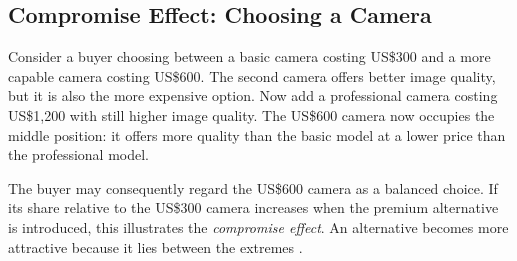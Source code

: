 \documentclass[12pt,oneside]{report}
\begin{document}
\subsection{Compromise Effect: Choosing a Camera}

Consider a buyer choosing between a basic camera costing US\$300
and a more capable camera costing US\$600. The second camera offers
better image quality, but it is also the more expensive option.
Now add a professional camera costing US\$1,200 with still higher
image quality. The US\$600 camera now occupies the middle position:
it offers more quality than the basic model at a lower price than
the professional model.

The buyer may consequently regard the US\$600 camera as a balanced
choice. If its share relative to the US\$300 camera increases when
the premium alternative is introduced, this illustrates the
\emph{compromise effect}. An alternative becomes more attractive
because it lies between the extremes \citep{simonson1989motivation}.
\end{document}
